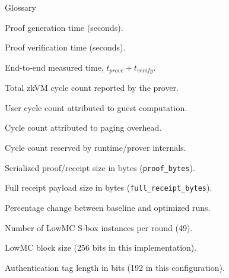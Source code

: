 
\begin{dictionary}{Glossary}
\item[$t_{prove}$] Proof generation time (seconds).
\item[$t_{verify}$] Proof verification time (seconds).
\item[$t_{total}$] End-to-end measured time, $t_{prove}+t_{verify}$.
\item[$C_{total}$] Total zkVM cycle count reported by the prover.
\item[$C_{user}$] User cycle count attributed to guest computation.
\item[$C_{paging}$] Cycle count attributed to paging overhead.
\item[$C_{reserved}$] Cycle count reserved by runtime/prover internals.
\item[$|\pi|$] Serialized proof/receipt size in bytes (\texttt{proof\_bytes}).
\item[$|R|$] Full receipt payload size in bytes
(\texttt{full\_receipt\_bytes}).
\item[$\Delta\%$] Percentage change between baseline and optimized runs.
\item[$N_{sbox}$] Number of LowMC S-box instances per round (49).
\item[$B$] LowMC block size (256 bits in this implementation).
\item[$\tau$] Authentication tag length in bits (192 in this configuration).
\end{dictionary}
